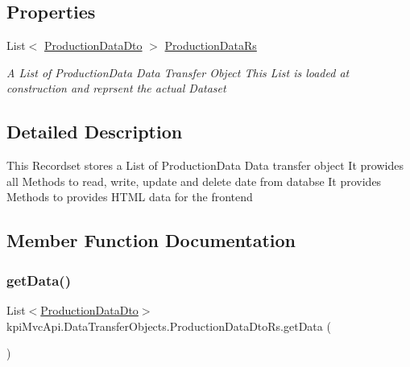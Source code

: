 \subsection*{Properties}
\begin{DoxyCompactItemize}
\item 
List$<$ \hyperlink{classkpi_mvc_api_1_1_data_transfer_objects_1_1_production_data_dto}{Production\+Data\+Dto} $>$ \hyperlink{classkpi_mvc_api_1_1_data_transfer_objects_1_1_production_data_dto_rs_a4f6705f015bff504dffa7567f1df1296}{Production\+Data\+Rs}
\begin{DoxyCompactList}\small\item\em A List of Production\+Data Data Transfer Object This List is loaded at construction and reprsent the actual Dataset \end{DoxyCompactList}\end{DoxyCompactItemize}


\subsection{Detailed Description}
This Recordset stores a List of Production\+Data Data transfer object It prowides all Methods to read, write, update and delete date from databse It provides Methods to provides H\+T\+ML data for the frontend 



\subsection{Member Function Documentation}
\mbox{\label{classkpi_mvc_api_1_1_data_transfer_objects_1_1_production_data_dto_rs_abd52b81c37bd026514f480e3d6dd952b}} 
\subsubsection{\texorpdfstring{get\+Data()}{getData()}}
{\footnotesize\ttfamily List$<$\hyperlink{classkpi_mvc_api_1_1_data_transfer_objects_1_1_production_data_dto}{Production\+Data\+Dto}$>$ kpi\+Mvc\+Api.\+Data\+Transfer\+Objects.\+Production\+Data\+Dto\+Rs.\+get\+Data (\begin{DoxyParamCaption}{ }\end{DoxyParamCaption})\hspace{0.3cm}{\ttfamily [inline]}}



